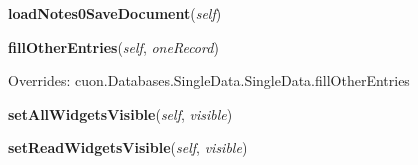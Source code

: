     \vspace{0.5ex}

\hspace{.8\funcindent}\begin{boxedminipage}{\funcwidth}

    \raggedright \textbf{loadNotes0SaveDocument}(\textit{self})

\setlength{\parskip}{2ex}
\setlength{\parskip}{1ex}
    \end{boxedminipage}

    \vspace{0.5ex}

\hspace{.8\funcindent}\begin{boxedminipage}{\funcwidth}

    \raggedright \textbf{fillOtherEntries}(\textit{self}, \textit{oneRecord})

\setlength{\parskip}{2ex}
\setlength{\parskip}{1ex}
      Overrides: cuon.Databases.SingleData.SingleData.fillOtherEntries

    \end{boxedminipage}

    \label{cuon:DMS:SingleDMS:SingleDMS:setAllWidgetsVisible}

    \vspace{0.5ex}

\hspace{.8\funcindent}\begin{boxedminipage}{\funcwidth}

    \raggedright \textbf{setAllWidgetsVisible}(\textit{self}, \textit{visible})

\setlength{\parskip}{2ex}
\setlength{\parskip}{1ex}
    \end{boxedminipage}

    \label{cuon:DMS:SingleDMS:SingleDMS:setReadWidgetsVisible}

    \vspace{0.5ex}

\hspace{.8\funcindent}\begin{boxedminipage}{\funcwidth}

    \raggedright \textbf{setReadWidgetsVisible}(\textit{self}, \textit{visible})

\setlength{\parskip}{2ex}
\setlength{\parskip}{1ex}
    \end{boxedminipage}

